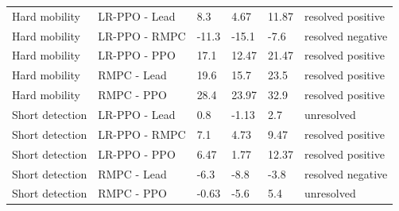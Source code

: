 \begin{table}[t]
\begin{tabular}{llllll}
Hard mobility & LR-PPO - Lead & 8.3 & 4.67 & 11.87 & resolved positive \\
Hard mobility & LR-PPO - RMPC & -11.3 & -15.1 & -7.6 & resolved negative \\
Hard mobility & LR-PPO - PPO & 17.1 & 12.47 & 21.47 & resolved positive \\
Hard mobility & RMPC - Lead & 19.6 & 15.7 & 23.5 & resolved positive \\
Hard mobility & RMPC - PPO & 28.4 & 23.97 & 32.9 & resolved positive \\
Short detection & LR-PPO - Lead & 0.8 & -1.13 & 2.7 & unresolved \\
Short detection & LR-PPO - RMPC & 7.1 & 4.73 & 9.47 & resolved positive \\
Short detection & LR-PPO - PPO & 6.47 & 1.77 & 12.37 & resolved positive \\
Short detection & RMPC - Lead & -6.3 & -8.8 & -3.8 & resolved negative \\
Short detection & RMPC - PPO & -0.63 & -5.6 & 5.4 & unresolved \\
\hline
\end{tabular}
\end{table}
